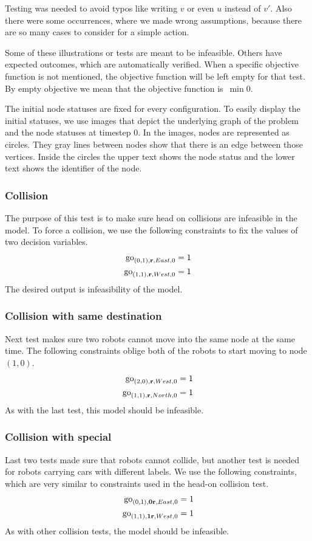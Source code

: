 Testing was needed to avoid typos like writing $v$ or even $u$ instead of $v'$.
Also there were some occurrences, where we made wrong assumptions, because there
are so many cases to consider for a simple action.

Some of these illustrations or tests are meant to be infeasible. Others have
expected outcomes, which are automatically verified. When a specific
objective function is not mentioned, the objective function will be left empty
for that test. By empty objective we mean that the objective function is~$\min
0$.

The initial node statuses are fixed for every configuration. To easily display
the initial statuses, we use images that depict the underlying graph of the
problem and the node statuses at timestep 0. In the images, nodes are
represented as circles. They gray lines between nodes show that there is an
edge between those vertices. Inside the circles the upper text shows the node
status and the lower text shows the identifier of the node.
\subsubsection{Collision}
The purpose of this test is to make sure head on collisions are infeasible in
the model.
To force a collision, we use the following constraints to fix the values of two decision
variables.
\begin{align}
    \mathrm{go}_{(0,1),\text{\bf r},East,0} &= 1\\
    \mathrm{go}_{(1,1),\text{\bf r},West,0} &= 1
\end{align}
The desired output is infeasibility of the model.
\subsubsection{Collision with same destination}
Next test makes sure two robots cannot move into the same node at the same
time.
The following constraints oblige both of the robots to start moving to node $(1,0)$.
\begin{align}
    \mathrm{go}_{(2,0),\text{\bf r},West,0} &= 1\\
    \mathrm{go}_{(1,1),\text{\bf r},North,0} &= 1
\end{align}
As with the last test, this model should be infeasible.
\subsubsection{Collision with special}
Last two tests made sure that robots cannot collide, but another test is needed
for robots carrying cars with different labels.
We use the following constraints, which are very similar to constraints used in
the head-on collision test.
\begin{align}
    \mathrm{go}_{(0,1),\text{\bf 0r},East,0} &= 1\\
    \mathrm{go}_{(1,1),\text{\bf 1r},West,0} &= 1
\end{align}
As with other collision tests, the model should be infeasible.
